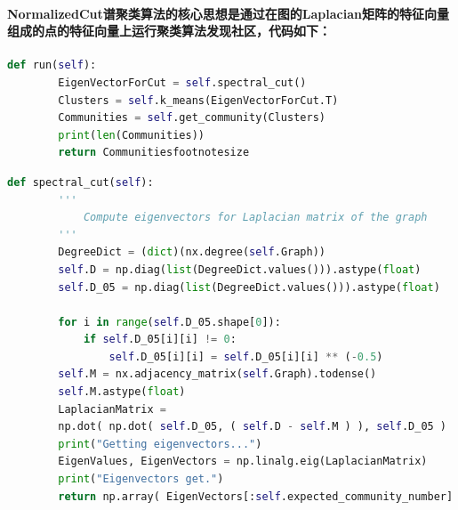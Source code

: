 \documentclass{ctexart}
\begin{document}
    \paragraph{NormalizedCut谱聚类算法的核心思想是通过在图的Laplacian矩阵的特征向量组成的点的特征向量上运行聚类算法发现社区，代码如下：\\[50pt]}
    \begin{lstlisting}[language=python, basicstyle=\normalsize,keywordstyle=\color{blue!100},commentstyle=\color{red!100!},frame=shadowbox, rulesepcolor=\color{red!20!green!20!blue!20}]
        def run(self):
        EigenVectorForCut = self.spectral_cut()
        Clusters = self.k_means(EigenVectorForCut.T)
        Communities = self.get_community(Clusters)
        print(len(Communities))
        return Communitiesfootnotesize
    \end{lstlisting}
    \begin{lstlisting}[language=python, basicstyle=\normalsize,keywordstyle=\color{blue!100},commentstyle=\color{red!100!},frame=shadowbox, rulesepcolor=\color{red!20!green!20!blue!20}]
        def spectral_cut(self):
        '''
            Compute eigenvectors for Laplacian matrix of the graph
        '''
        DegreeDict = (dict)(nx.degree(self.Graph))
        self.D = np.diag(list(DegreeDict.values())).astype(float)
        self.D_05 = np.diag(list(DegreeDict.values())).astype(float)

        for i in range(self.D_05.shape[0]):
            if self.D_05[i][i] != 0:
                self.D_05[i][i] = self.D_05[i][i] ** (-0.5)
        self.M = nx.adjacency_matrix(self.Graph).todense()
        self.M.astype(float)
        LaplacianMatrix = 
        np.dot( np.dot( self.D_05, ( self.D - self.M ) ), self.D_05 )
        print("Getting eigenvectors...")
        EigenValues, EigenVectors = np.linalg.eig(LaplacianMatrix)
        print("Eigenvectors get.")
        return np.array( EigenVectors[:self.expected_community_number] )
    \end{lstlisting}
\end{document}
